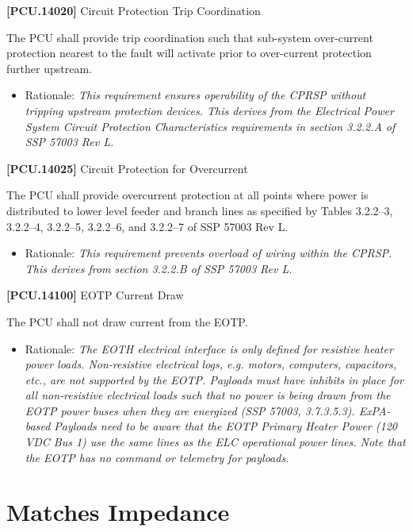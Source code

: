 \documentclass[12pt,oneside,oldfontcommands]{memoir}
\begin{document}
\textbf{[PCU.14020]} Circuit Protection Trip Coordination

The \gls{PCU} shall provide trip coordination such that sub-system over-current protection nearest to the fault will activate prior to over-current protection further upstream.

\begin{itemize}
\item{} Rationale: \emph{This requirement ensures operability of the CPRSP without tripping upstream protection devices. This derives from the Electrical Power System Circuit Protection Characteristics requirements in section 3.2.2.A of SSP 57003 Rev L.}

\end{itemize}

\textbf{[PCU.14025]} Circuit Protection for Overcurrent

The \gls{PCU} shall provide overcurrent protection at all points where power is distributed to lower level feeder and branch lines as specified by Tables 3.2.2--3, 3.2.2--4, 3.2.2--5, 3.2.2--6, and 3.2.2--7 of SSP 57003 Rev L.

\begin{itemize}
\item{} Rationale: \emph{This requirement prevents overload of wiring within the CPRSP. This derives from section 3.2.2.B of SSP 57003 Rev L.}

\end{itemize}

\textbf{[PCU.14100]} \gls{EOTP} Current Draw

The \gls{PCU} shall not draw current from the \gls{EOTP}.

\begin{itemize}
\item{} Rationale: \emph{The EOTH electrical interface is only defined for resistive heater power loads. Non-resistive electrical logs, \emph{e.g.} motors, computers, capacitors, \emph{etc.}, are not supported by the EOTP. Payloads must have inhibits in place for all non-resistive electrical loads such that no power is being drawn from the EOTP power buses when they are energized (SSP 57003, 3.7.3.5.3). ExPA-based Payloads need to be aware that the EOTP Primary Heater Power (120 VDC Bus 1) use the same lines as the ELC operational power lines. Note that the EOTP has no command or telemetry for payloads.}

\end{itemize}

\section{Matches Impedance}
\label{matchesimpedance}
\end{document}
